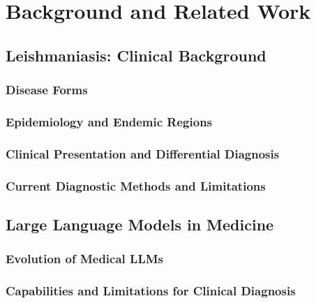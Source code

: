 \chapter{Background and Related Work}
\label{ch:background}

%
%
\section{Leishmaniasis: Clinical Background}
\label{sec:background:leishmaniasis}

\subsection{Disease Forms}
\label{subsec:background:leishmaniasis:forms}

\subsection{Epidemiology and Endemic Regions}
\label{subsec:background:leishmaniasis:epidemiology}

\subsection{Clinical Presentation and Differential Diagnosis}
\label{subsec:background:leishmaniasis:clinical}

\subsection{Current Diagnostic Methods and Limitations}
\label{subsec:background:leishmaniasis:diagnosis}

%
%
\section{Large Language Models in Medicine}
\label{sec:background:llm}

\subsection{Evolution of Medical LLMs}
\label{subsec:background:llm:evolution}

\subsection{Capabilities and Limitations for Clinical Diagnosis}
\label{subsec:background:llm:capabilities}

